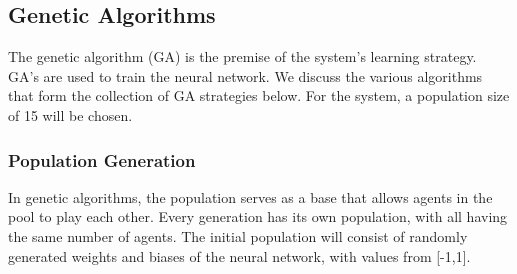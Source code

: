 \documentclass[12pt,a4paper]{article}
\begin{document}
\begin{figure}[ht!]
        \end{figure}
    


    \subsection{Genetic Algorithms}
        The genetic algorithm (GA) is the premise of the system's learning strategy. GA's are used to train the neural network. We discuss the various algorithms that form the collection of GA strategies below. For the system, a population size of 15 will be chosen.

        \subsubsection{Population Generation} \label{population_generation}
            In genetic algorithms, the population serves as a base that allows agents in the pool to play each other. Every generation has its own population, with all having the same number of agents. The initial population will consist of randomly generated weights and biases of the neural network, with values from [-1,1]. 
            
\end{document}
